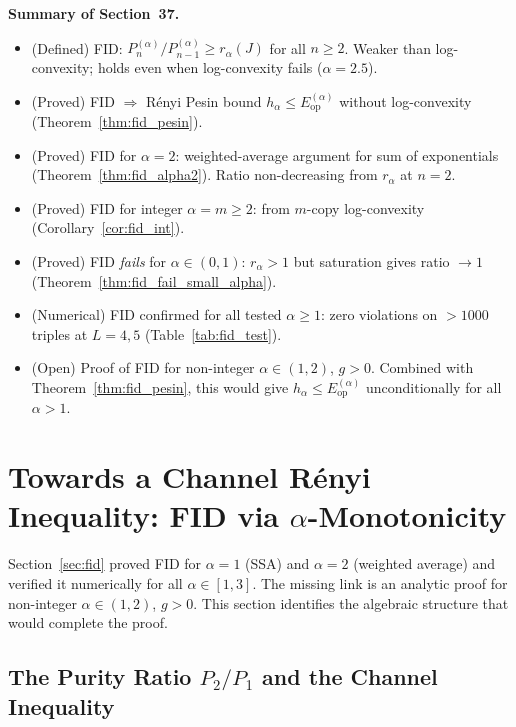 \documentclass[12pt,a4paper]{article}
\begin{document}
\bigskip
\noindent\textbf{Summary of Section~37.}
\begin{itemize}
\item (Defined) FID: $P_n^{(\alpha)}/P_{n-1}^{(\alpha)}\geq r_\alpha(J)$ for all $n\geq 2$.
  Weaker than log-convexity; holds even when log-convexity fails ($\alpha=2.5$).
\item (Proved) FID $\Rightarrow$ Rényi Pesin bound $h_\alpha\leq E_{\mathrm{op}}^{(\alpha)}$
  without log-convexity (Theorem~\ref{thm:fid_pesin}).
\item (Proved) FID for $\alpha=2$: weighted-average argument for sum of exponentials
  (Theorem~\ref{thm:fid_alpha2}). Ratio non-decreasing from $r_\alpha$ at $n=2$.
\item (Proved) FID for integer $\alpha=m\geq 2$: from $m$-copy log-convexity
  (Corollary~\ref{cor:fid_int}).
\item (Proved) FID \emph{fails} for $\alpha\in(0,1)$: $r_\alpha>1$ but saturation
  gives ratio $\to 1$ (Theorem~\ref{thm:fid_fail_small_alpha}).
\item (Numerical) FID confirmed for all tested $\alpha\geq 1$: zero violations
  on $>1000$ triples at $L=4,5$ (Table~\ref{tab:fid_test}).
\item (Open) Proof of FID for non-integer $\alpha\in(1,2)$, $g>0$.
  Combined with Theorem~\ref{thm:fid_pesin}, this would give
  $h_\alpha\leq E_{\mathrm{op}}^{(\alpha)}$ unconditionally for all $\alpha>1$.
\end{itemize}

\section{Towards a Channel Rényi Inequality: FID via $\alpha$-Monotonicity}
\label{sec:channel_renyi}

Section~\ref{sec:fid} proved FID for $\alpha=1$ (SSA) and $\alpha=2$ (weighted average)
and verified it numerically for all $\alpha\in[1,3]$.  The missing link is an analytic
proof for non-integer $\alpha\in(1,2)$, $g>0$.  This section identifies the
algebraic structure that would complete the proof.

\subsection{The Purity Ratio $P_2/P_1$ and the Channel Inequality}
\label{sec:cr_ratio}
\end{document}
